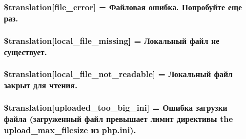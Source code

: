 \subsubsection[{\$translation}]{\setlength{\rightskip}{0pt plus 5cm}\$translation\mbox{[}\textquotesingle{}file\+\_\+error\textquotesingle{}\mbox{]} = \textquotesingle{}Файловая ошибка. Попробуйте еще раз.\textquotesingle{}}\label{class_8upload_8ru___r_u_8php_ac7498e49b9771b04698029aa61c70821}
\hypertarget{class_8upload_8ru___r_u_8php_a6ec3d3a47ab70d77e7aa593e82ead10e}{}
\subsubsection[{\$translation}]{\setlength{\rightskip}{0pt plus 5cm}\$translation\mbox{[}\textquotesingle{}local\+\_\+file\+\_\+missing\textquotesingle{}\mbox{]} = \textquotesingle{}Локальный файл не существует.\textquotesingle{}}\label{class_8upload_8ru___r_u_8php_a6ec3d3a47ab70d77e7aa593e82ead10e}
\hypertarget{class_8upload_8ru___r_u_8php_a60104befef9b241f3a7a6a755618a4b3}{}
\subsubsection[{\$translation}]{\setlength{\rightskip}{0pt plus 5cm}\$translation\mbox{[}\textquotesingle{}local\+\_\+file\+\_\+not\+\_\+readable\textquotesingle{}\mbox{]} = \textquotesingle{}Локальный файл закрыт для чтения.\textquotesingle{}}\label{class_8upload_8ru___r_u_8php_a60104befef9b241f3a7a6a755618a4b3}
\hypertarget{class_8upload_8ru___r_u_8php_a6a08dcd0d3651fdd098568f6b2f0a42c}{}
\subsubsection[{\$translation}]{\setlength{\rightskip}{0pt plus 5cm}\$translation\mbox{[}\textquotesingle{}uploaded\+\_\+too\+\_\+big\+\_\+ini\textquotesingle{}\mbox{]} = \textquotesingle{}Ошибка загрузки файла (загруженный файл превышает лимит директивы the upload\+\_\+max\+\_\+filesize из php.\+ini).\textquotesingle{}}\label{class_8upload_8ru___r_u_8php_a6a08dcd0d3651fdd098568f6b2f0a42c}
\hypertarget{class_8upload_8ru___r_u_8php_a623d5b8b92169f57d7e43458aa911cbb}{}
